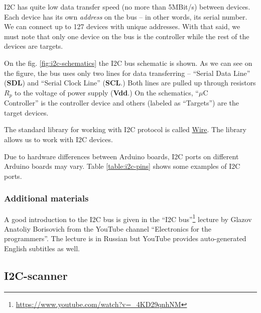 \documentclass[../sparc.tex]{subfiles}
\begin{document}
\gls{I2C} has quite low data transfer speed (no more than 5MBit/s) between
devices.  Each device has its own \textit{address} on the bus -- in other words,
its serial number.  We can connect up to 127 devices with unique addresses.
With that said, we must note that only one device on the bus is the controller
while the rest of the devices are targets.

On the fig. \ref{fig:i2c-schematics} the \gls{I2C} bus schematic is shown.  As
we can see on the figure, the bus uses only two lines for data transferring --
``Serial Data Line'' (\textbf{SDL}) and ``Serial Clock Line'' (\textbf{SCL}.)
Both lines are pulled up through resistors \textbf{$R_p$} to the voltage of
power supply (\textbf{Vdd}.)  On the schematics, ``$\mu$C\\Controller'' is the
controller device and others (labeled as ``Targets'') are the target devices.


The standard library for working with I2C protocol is called
\href{https://www.arduino.cc/reference/en/language/functions/communication/wire/}{Wire}.
The library allows us to work with I2C devices.


Due to hardware differences between Arduino boards, I2C ports on different
Arduino boards may vary.  Table \ref{table:i2c-pins} shows some examples of I2C
ports.

\subsubsection{Additional materials}

A good introduction to the I2C bus is given in the ``I2C
bus''\footnote{\url{https://www.youtube.com/watch?v=_4KD29qnhNM}} lecture by
Glazov Anatoliy Borisovich from the YouTube channel ``Electronics for the
programmers''.  The lecture is in Russian but YouTube provides auto-generated
English subtitles as well.


\subsection{I2C-scanner}
\label{section:i2c-scanner}
\end{document}
